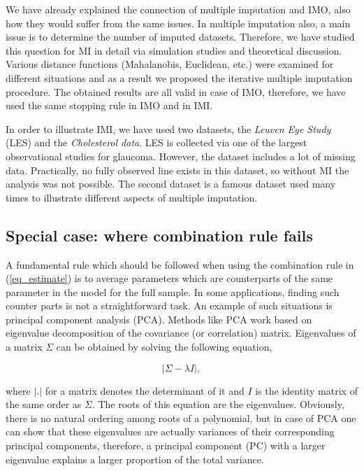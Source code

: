 \documentclass[11pt,a5paper,twoside]{book}
\begin{document}
We have already explained the connection of multiple imputation and IMO, also how they would suffer from the same issues. In multiple imputation also, a main issue is to determine the number of imputed datasets. Therefore, we have studied this question for MI in detail via simulation studies and theoretical discussion. Various distance functions (Mahalanobis, Euclidean, etc.) were examined for different situations and as a result we proposed the iterative multiple imputation procedure. The obtained results are all valid in case of IMO, therefore, we have used the same stopping rule in IMO and in IMI.

In order to illustrate IMI, we have used two datasets, the \emph{Leuven Eye Study} (LES) and the \emph{Cholesterol data}. LES is collected via one of the largest observational studies for glaucoma. However, the dataset includes a lot of missing data. Practically, no fully observed line exists in this dataset, so without MI the analysis was not possible. The second dataset is a famous dataset used many times to illustrate different aspects of multiple imputation.



\subsection{Special case: where combination rule fails}

A fundamental rule which should be followed when using the combination rule in (\ref{eq_estimate}) is to average parameters which are counterparts of the same parameter in the model for the full sample. In some applications, finding such counter parts is not a straightforward task. An example of such situations is principal component analysis (PCA). Methods like PCA work based on eigenvalue decomposition of the covariance (or correlation) matrix. Eigenvalues of a matrix $\Sigma$ can be obtained by solving the following equation,

$$|\Sigma-\lambda I|,$$ 

where $|.|$ for a matrix denotes the determinant of it and $I$ is the identity matrix of the same order as $\Sigma$. The roots of this equation are the eigenvalues. Obviously, there is no natural ordering among roots of a polynomial, but in case of PCA one can show that \citep{mardiamultivariate} these eigenvalues are actually variances of their corresponding principal components, therefore, a principal component (PC) with a larger eigenvalue explains a larger proportion of the total variance. 
\end{document}
